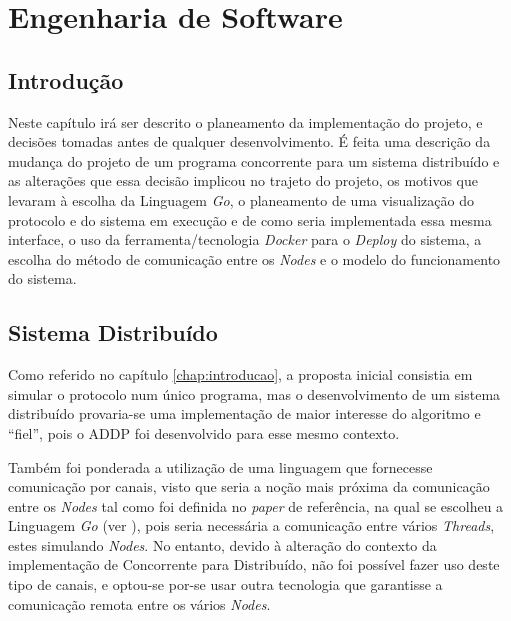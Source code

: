 \chapter{Engenharia de Software}
\label{chap:engenharia}

\section{Introdução}
\label{engenharia:sec:introducao}
Neste capítulo irá ser descrito o planeamento da implementação do projeto, e decisões tomadas antes de qualquer desenvolvimento.
É feita uma descrição da mudança do projeto de um programa concorrente para um sistema distribuído e as alterações que essa decisão implicou no trajeto do projeto,
os motivos que levaram à escolha da Linguagem \emph{Go}, o planeamento de uma visualização do protocolo e do sistema em execução e de como seria implementada essa
mesma interface, o uso da ferramenta/tecnologia \emph{Docker} para o \emph{Deploy} do sistema, a escolha do método de comunicação entre os \emph{Nodes} e o modelo
do funcionamento do sistema.


\section{Sistema Distribuído}
\label{engenharia:sec:sistema}
\begin{comment}
- Inicialmente Concorrente
- O Algoritmo foi definido para sistemas distribuídos
- Mais interessante e abrange os dois temas ao mesmo tempo
- Não se fez uso dos canais do Go, mas fez-se uso de ligações HTTP
\end{comment}

Como referido no capítulo \ref{chap:introducao}, a proposta inicial consistia em simular o protocolo num único programa,
mas o desenvolvimento de um sistema distribuído 
provaria-se uma implementação de maior interesse do algoritmo e ``fiel'', pois o \acs*{ADDP} foi desenvolvido para esse mesmo contexto.

Também foi ponderada a utilização de uma linguagem que fornecesse comunicação por canais,
visto que seria a noção mais próxima da comunicação entre os \emph{Nodes} tal como foi definida no \emph{paper} de referência, na qual se
escolheu a Linguagem \emph{Go} (ver \label{implementacao:subsec:go}), pois seria necessária a comunicação entre vários \emph{Threads}, estes simulando \emph{Nodes}.
No entanto, devido à alteração do contexto da implementação de Concorrente para Distribuído, não foi possível fazer uso deste tipo de canais, 
e optou-se por-se usar outra tecnologia que garantisse a comunicação remota entre os vários \emph{Nodes}.




